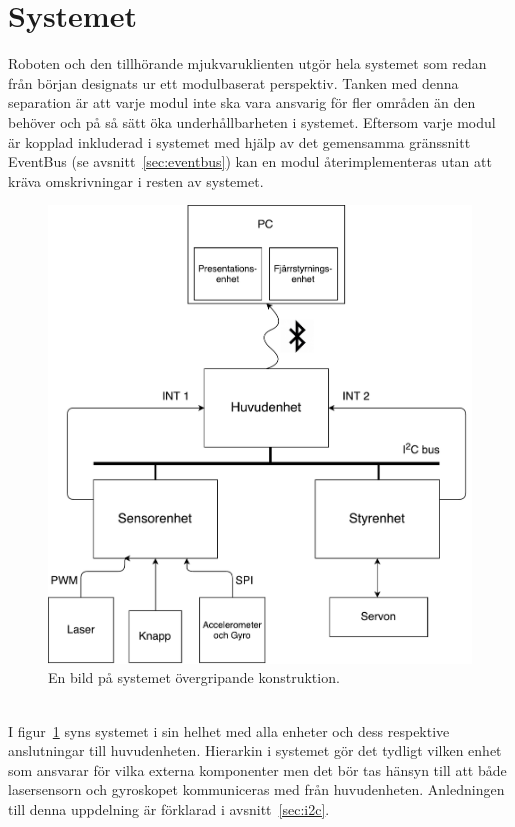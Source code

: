 \documentclass{article}
\begin{document}
\clearpage
\section{Systemet}
Roboten och den tillhörande mjukvaruklienten utgör hela systemet som redan från början designats ur ett modulbaserat perspektiv. Tanken med denna separation är att varje modul inte ska vara ansvarig för fler områden än den behöver och på så sätt öka underhållbarheten i systemet. Eftersom varje modul är kopplad inkluderad i systemet med hjälp av det gemensamma gränssnitt EventBus (se avsnitt~\ref{sec:eventbus}) kan en modul återimplementeras utan att kräva omskrivningar i resten av systemet.

\begin{figure}[H]
\centering
\includegraphics[scale=0.4]{oversikt_systemet}
\caption{En bild på systemet övergripande konstruktion.}
\label{fig:oversikt_systemet}
\end{figure}
\ \\
I figur~\ref{fig:oversikt_systemet} syns systemet i sin helhet med alla enheter och dess respektive anslutningar till huvudenheten. Hierarkin i systemet gör det tydligt vilken enhet som ansvarar för vilka externa komponenter men det bör tas hänsyn till att både lasersensorn och gyroskopet kommuniceras med från huvudenheten. Anledningen till denna uppdelning är förklarad i avsnitt~\ref{sec:i2c}.
\end{document}
